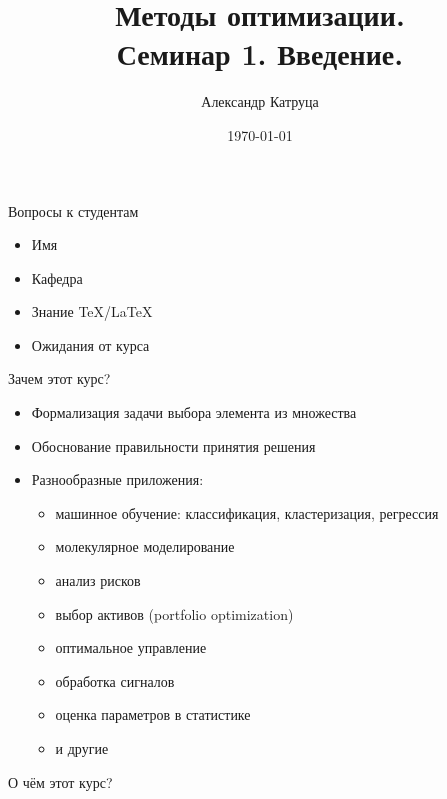\documentclass[12pt]{beamer}
\title[Семинар 1]{Методы оптимизации. \\
Семинар 1. Введение.}
\author{Александр Катруца}
\institute{Московский физико-технический институт,\\
Факультет Управления и Прикладной Математики}
\date{\today}
\begin{document}
\begin{frame}
\titlepage
\end{frame}

\begin{frame}{Вопросы к студентам}
\begin{itemize}
\item Имя
\item Кафедра
\item Знание \TeX/\LaTeX
\item Ожидания от курса
\end{itemize}

\end{frame}

\begin{frame}{Зачем этот курс?}
\begin{itemize}[<+->]
\item Формализация задачи выбора элемента из множества
\item Обоснование правильности принятия решения
\item Разнообразные приложения:
\begin{itemize}
\item машинное обучение: классификация, кластеризация, регрессия
\item молекулярное моделирование
\item анализ рисков
\item выбор активов (portfolio optimization)
\item оптимальное управление
\item обработка сигналов
\item оценка параметров в статистике 
\item и другие%
\end{itemize}
\end{itemize}
\end{frame}

\begin{frame}{О чём этот курс?}
\end{frame}
\end{document}
